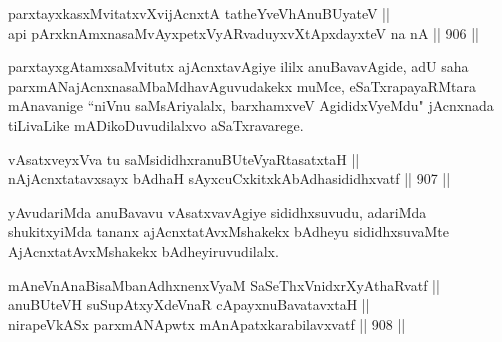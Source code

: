 \begin{shl}
parxtayxkasxMvitatxvXvijAcnxtA tatheYveVhAnuBUyateV || \\
api pArxknAmxnasaMvAyxpetxVyARvaduyxvXtApxdayxteV  na nA \hfill || 906 ||  
\end{shl}

\begin{artha}
parxtayxgAtamxsaMvitutx ajAcnxtavAgiye ililx anuBavavAgide, adU saha parxmANajAcnxnasaMbaMdhavAguvudakekx muMce, eSaTxrapayaRMtara mAnavanige ``niVnu saMsAriyalalx, barxhamxveV AgididxVyeMdu" jAcnxnada tiLivaLike mADikoDuvudilalxvo aSaTxravarege.
\end{artha}


\begin{shl}
vAsatxveyxVva tu saMsididhxranuBUteVyaRtasatxtaH || \\
nAjAcnxtatavxsayx bAdhaH sAyxcuCxkitxkAbAdhasididhxvatf \hfill || 907 ||  
\end{shl}

\begin{artha}
yAvudariMda anuBavavu vAsatxvavAgiye sididhxsuvudu, adariMda shukitxyiMda tananx ajAcnxtatAvxMshakekx bAdheyu sididhxsuvaMte AjAcnxtatAvxMshakekx bAdheyiruvudilalx.
\end{artha}

\begin{shl}
mAneVnAnaBisaMbanAdhxnenxVyaM SaSeThxVnidxrXyAthaRvatf || \\
anuBUteVH suSupAtxyXdeVnaR cApayxnuBavatavxtaH || \\
nirapeVkASx parxmANApwtx mAnApatxkarabilavxvatf \hfill || 908 ||  
\end{shl}

